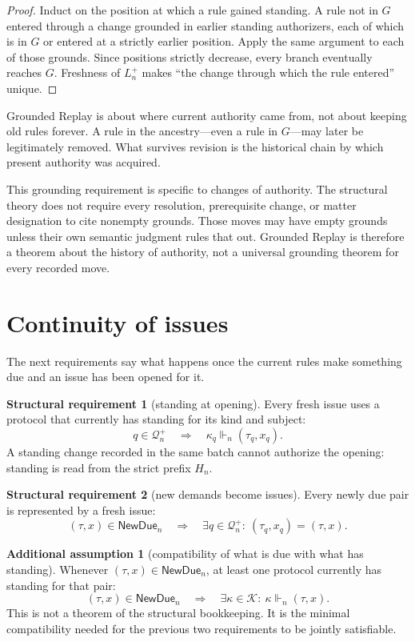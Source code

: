 \documentclass[11pt]{article}
\theoremstyle{definition}
\newtheorem{requirement}{Structural requirement}
\newtheorem*{assumption}{Additional assumption}
\theoremstyle{remark}
\newcommand{\NewDue}{\mathsf{NewDue}}
\newcommand{\Born}{\mathcal Q^{+}}
\begin{document}
\begin{proof}
Induct on the position at which a rule gained standing. A rule not in $G$
entered through a change grounded in earlier standing authorizers, each of
which is in $G$ or entered at a strictly earlier position. Apply the same
argument to each of those grounds. Since positions strictly decrease, every
branch eventually reaches $G$. Freshness of $L_n^+$ makes ``the change through
which the rule entered'' unique.
\end{proof}

Grounded Replay is about where current authority came from, not about keeping
old rules forever. A rule in the ancestry---even a rule in $G$---may later be
legitimately removed. What survives revision is the historical chain by which
present authority was acquired.

This grounding requirement is specific to changes of authority. The structural
theory does not require every resolution, prerequisite change, or matter
designation to cite nonempty grounds. Those moves may have empty grounds unless
their own semantic judgment rules that out. Grounded Replay is therefore a
theorem about the history of authority, not a universal grounding theorem for
every recorded move.

\section{Continuity of issues}\label{sec:issues}

The next requirements say what happens once the current rules make something
due and an issue has been opened for it.

\begin{requirement}[standing at opening]\label{req:anchor}
Every fresh issue uses a protocol that currently has standing for its kind and
subject:
\[
 q\in\Born_n\quad\Longrightarrow\quad
 \kappa_q\Vdash_n(\tau_q,x_q).
\]
A standing change recorded in the same batch cannot authorize the opening:
standing is read from the strict prefix $H_n$.
\end{requirement}

\begin{requirement}[new demands become issues]\label{req:due}
Every newly due pair is represented by a fresh issue:
\[
 (\tau,x)\in\NewDue_n
 \quad\Longrightarrow\quad
 \exists q\in\Born_n:\ (\tau_q,x_q)=(\tau,x).
\]
\end{requirement}

\begin{assumption}[compatibility of what is due with what has standing]\label{assump:compat}
Whenever $(\tau,x)\in\NewDue_n$, at least one protocol currently has standing
for that pair:
\[
 (\tau,x)\in\NewDue_n
 \quad\Longrightarrow\quad
 \exists\kappa\in\mathcal K:\ \kappa\Vdash_n(\tau,x).
\]
This is not a theorem of the structural bookkeeping. It is the minimal
compatibility needed for the previous two requirements to be jointly
satisfiable.
\end{assumption}
\end{document}
